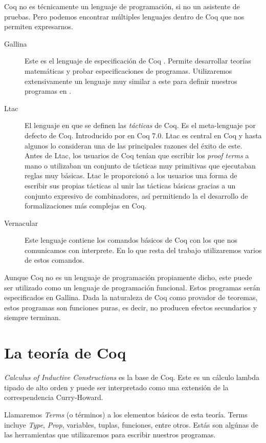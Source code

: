 Coq no es técnicamente un lenguaje de programación, si no un asistente de pruebas. Pero podemos encontrar múltiples lenguajes dentro de Coq que nos permiten expresarnos. 
\begin{description}
    \item[Gallina] Este es el lenguaje de especificación de Coq \cite{Gallina}. Permite desarrollar teorías matemáticas y probar especificaciones de programas. Utilizaremos extensivamente un lenguaje muy similar a este para definir nuestros programas en \Mtac.
    \item[Ltac] El lenguaje en que se definen las \textit{tácticas} de Coq. Es el meta-lenguaje por defecto de Coq. Introducido por \citeauthor{DBLP:conf/lpar/Delahaye00} \cite{DBLP:conf/lpar/Delahaye00} en Coq 7.0. Ltac es central en Coq y hasta algunos lo consideran una de las principales razones del éxito de este. Antes de Ltac, los usuarios de Coq tenían que escribir los \textit{proof terms} a mano o utilizaban un conjunto de tácticas muy primitivas que ejecutaban reglas muy básicas. Ltac le proporcionó a los usuarios una forma de escribir sus propias tácticas al unir las tácticas básicas gracias a un conjunto expresivo de combinadores, así permitiendo la el desarrollo de formalizaciones más complejas en Coq.
    \item[Vernacular] Este lenguaje contiene los comandos básicos de Coq con los que nos comunicamos con interprete. En lo que resta del trabajo utilizaremos varios de estos comandos.
\end{description}

Aunque Coq no es un lenguaje de programación propiamente dicho, este puede ser utilizado como un lenguaje de programación funcional. Estos programas serán especificados en Gallina. Dada la naturaleza de Coq como provador de teoremas, estos programas son funciones puras, es decir, no producen efectos secundarios y siempre terminan.

\section{La teoría de Coq}

\textit{Calculus of Inductive Constructions} \cite{CIC} es la base de Coq. Este es un cálculo lambda tipado de alto orden y puede ser interpretado como una extensión de la correspendencia Curry-Howard.

Llamaremos \textit{Terms} (o términos) a los elementos básicos de esta teoría. Terms incluye \textit{Type}, \textit{Prop}, variables, tuplas, funciones, entre otros. Estás son algúnas de las herramientas que utilizaremos para escribir nuestros programas.

